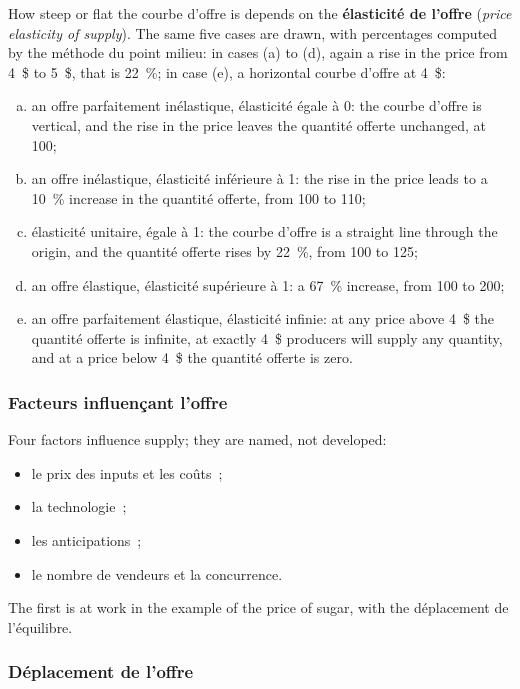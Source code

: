 How steep or flat the courbe d'offre is depends on the \textbf{élasticité de
l'offre} (\textit{price elasticity of supply}). The same five cases are drawn, with
percentages computed by the méthode du point milieu: in cases (a) to (d), again a
rise in the price from 4~\$ to 5~\$, that is 22~\%; in case (e), a horizontal
courbe d'offre at 4~\$:
\begin{enumerate}[(a)]
  \item an offre parfaitement inélastique, élasticité égale à 0: the courbe d'offre
    is vertical, and the rise in the price leaves the quantité offerte unchanged, at
    100;
  \item an offre inélastique, élasticité inférieure à 1: the rise in the price leads
    to a 10~\% increase in the quantité offerte, from 100 to 110;
  \item élasticité unitaire, égale à 1: the courbe d'offre is a straight line
    through the origin, and the quantité offerte rises by 22~\%, from 100 to 125;
  \item an offre élastique, élasticité supérieure à 1: a 67~\% increase, from 100
    to 200;
  \item an offre parfaitement élastique, élasticité infinie: at any price above
    4~\$ the quantité offerte is infinite, at exactly 4~\$ producers will supply any
    quantity, and at a price below 4~\$ the quantité offerte is zero.
\end{enumerate}

\subsubsection{Facteurs influençant l'offre}

Four factors influence supply; they are named, not developed:
\begin{itemize}
  \item le prix des inputs et les coûts~;
  \item la technologie~;
  \item les anticipations~;
  \item le nombre de vendeurs et la concurrence.
\end{itemize}
The first is at work in the example of the price of sugar, with the déplacement de
l'équilibre.

\subsubsection{Déplacement de l'offre}

